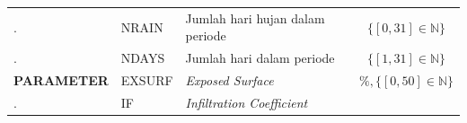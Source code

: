 \documentclass[11pt]{article}
\begin{document}
\begin{longtable}[]{@{}lllc@{}}
\begin{minipage}[t]{0.22\columnwidth}\raggedright
.\strut
\end{minipage} & \begin{minipage}[t]{0.22\columnwidth}\raggedright
NRAIN\strut
\end{minipage} & \begin{minipage}[t]{0.22\columnwidth}\raggedright
Jumlah hari hujan dalam periode\strut
\end{minipage} & \begin{minipage}[t]{0.22\columnwidth}\centering
\(\{\left[0, 31\right] \in\mathbb{N}\}\)\strut
\end{minipage}\tabularnewline
\begin{minipage}[t]{0.22\columnwidth}\raggedright
.\strut
\end{minipage} & \begin{minipage}[t]{0.22\columnwidth}\raggedright
NDAYS\strut
\end{minipage} & \begin{minipage}[t]{0.22\columnwidth}\raggedright
Jumlah hari dalam periode\strut
\end{minipage} & \begin{minipage}[t]{0.22\columnwidth}\centering
\(\{\left[1, 31\right] \in\mathbb{N}\}\)\strut
\end{minipage}\tabularnewline
\begin{minipage}[t]{0.22\columnwidth}\raggedright
\textbf{PARAMETER}\strut
\end{minipage} & \begin{minipage}[t]{0.22\columnwidth}\raggedright
EXSURF\strut
\end{minipage} & \begin{minipage}[t]{0.22\columnwidth}\raggedright
\emph{Exposed Surface}\strut
\end{minipage} & \begin{minipage}[t]{0.22\columnwidth}\centering
\(\%, \{\left[0, 50\right] \in\mathbb{N}\}\)\strut
\end{minipage}\tabularnewline
\begin{minipage}[t]{0.22\columnwidth}\raggedright
.\strut
\end{minipage} & \begin{minipage}[t]{0.22\columnwidth}\raggedright
IF\strut
\end{minipage} & \begin{minipage}[t]{0.22\columnwidth}\raggedright
\emph{Infiltration Coefficient}\strut
\end{minipage} & \begin{minipage}[t]{0.22\columnwidth}\centering

\end{minipage}
\end{longtable}
\end{document}
